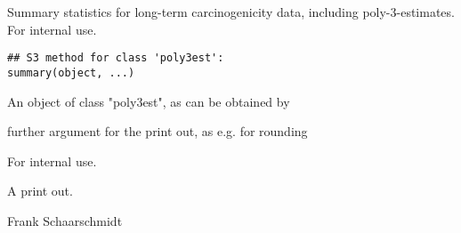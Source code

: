 \begin{Description}\relax
Summary statistics for long-term carcinogenicity data, including poly-3-estimates.
For internal use.
\end{Description}
\begin{Usage}
\begin{verbatim}
## S3 method for class 'poly3est':
summary(object, ...)
\end{verbatim}
\end{Usage}
\begin{Arguments}
\begin{ldescription}
\item[\code{object}] An object of class "poly3est", as can be obtained by  
\item[\code{...}] further argument for the print out, as e.g.  for rounding 
\end{ldescription}
\end{Arguments}
\begin{Details}\relax
For internal use.
\end{Details}
\begin{Value}
A print out.
\end{Value}
\begin{Author}\relax
Frank Schaarschmidt
\end{Author}
\begin{Examples}
\end{Examples}

